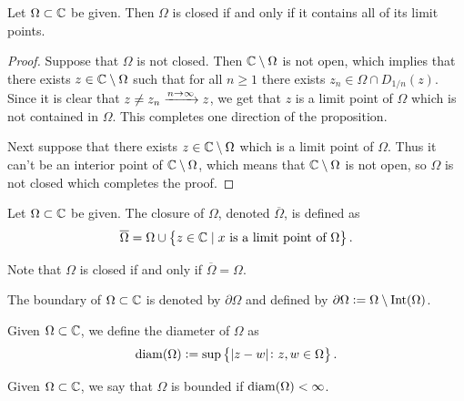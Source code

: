 \documentclass[11pt,a4paper]{article}
\begin{document}
\begin{proposition}
  Let $\Omega \subset \mathbb{C}$ be given.
  Then $\Omega$ is closed if and only if it contains
  all of its limit points.
\end{proposition}
\begin{proof}
  Suppose that $\Omega$ is not closed.
  Then $\mathbb{C} \setminus \Omega$ is not open,
  which implies that there exists $z \in \mathbb{C} \setminus \Omega$ such
  that for all $n \geq 1$ there exists $z_n \in \Omega \cap D_{1/n}(z)$.
  Since it is clear that $z \neq z_n \xrightarrow{n \to \infty} z$,
  we get that $z$ is a limit point of $\Omega$ which is not contained
  in $\Omega$.
  This completes one direction of the proposition.

  Next suppose that there exists $z \in \mathbb{C} \setminus \Omega$ which is
  a limit point of $\Omega$.
  Thus it can't be an interior point of $\mathbb{C} \setminus \Omega$,
  which means that $\mathbb{C} \setminus \Omega$ is not open,
  so $\Omega$ is not closed which completes the proof.
\end{proof}

\begin{definition}[Closure]
  Let $\Omega \subset \mathbb{C}$ be given.
  The closure of $\Omega$, denoted $\overline \Omega$, is defined
  as
  \[
      \overline \Omega =
      \Omega \cup
      \left\{z \in \mathbb{C} \mid \text{$x$ is a limit point of $\Omega$}\right\}.
  \]
\end{definition}

\begin{remark}
  Note that $\Omega$ is closed if and only if $\overline \Omega = \Omega$.
\end{remark}

\begin{definition}[Boundary]
  The boundary of $\Omega \subset \mathbb{C}$ is denoted by $\partial \Omega$
  and defined by $\partial \Omega := \Omega \setminus \operatorname{Int}(\Omega)$.
\end{definition}

\begin{definition}[Diameter]
  Given $\Omega \subset \mathbb{C}$, we define the diameter of $\Omega$ as
  \[
      \operatorname{diam}(\Omega) := \sup\left\{|z - w| \colon z,w \in \Omega\right\}.
  \]
\end{definition}

\begin{definition}
  Given $\Omega \subset \mathbb{C}$, we say that $\Omega$ is bounded if
  $\operatorname{diam}(\Omega) < \infty$.
\end{definition}
\end{document}
